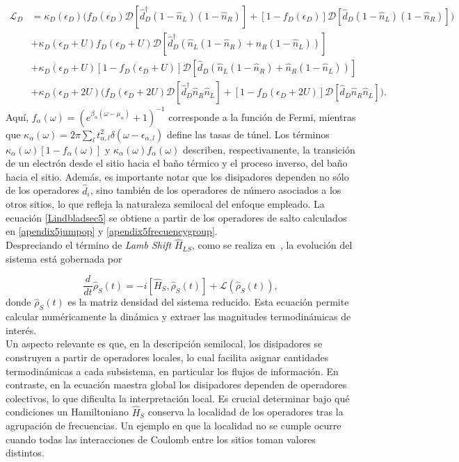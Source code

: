 \begin{align*}
\mathcal{L}_D &= \kappa_D(\epsilon_D)\big( f_D(\epsilon_D)\mathcal{D}[\hat{d}^\dagger_D(1-\hat{n}_L)(1-\hat{n}_R)] + [1-f_D(\epsilon_D)]\mathcal{D}[\hat{d}_D(1-\hat{n}_L)(1-\hat{n}_R)] \big) \\ 
&+ \kappa_D(\epsilon_D+U) f_D(\epsilon_D+U)\mathcal{D}[\hat{d}^\dagger_D(\hat{n}_L(1-\hat{n}_R) + \hat{n}_R(1-\hat{n}_L) )] \\
&+ \kappa_D(\epsilon_D+U) [1-f_D(\epsilon_D+U)]\mathcal{D}[\hat{d}_D(\hat{n}_L(1-\hat{n}_R) + \hat{n}_R(1-\hat{n}_L))]  \\
&+ \kappa_D(\epsilon_D+2U)\big( f_D(\epsilon_D+2U)\mathcal{D}[\hat{d}^\dagger_D\hat{n}_R\hat{n}_L] + [1-f_D(\epsilon_D+2U)]\mathcal{D}[\hat{d}_D\hat{n}_R\hat{n}_L] \big).
\end{align*}
Aquí, $f_\alpha(\omega) = \left(e^{\beta_\alpha(\omega-\mu_\alpha)}+1\right)^{-1}$ corresponde a la función de Fermi, mientras que $\kappa_\alpha(\omega) = 2\pi\sum_l t^2_{\alpha,l}\delta(\omega-\epsilon_{\alpha,l})$ define las tasas de túnel. Los términos $\kappa_\alpha(\omega)[1-f_\alpha(\omega)]$ y $\kappa_\alpha(\omega)f_{\alpha}(\omega)$ describen, respectivamente, la transición de un electrón desde el sitio hacia el baño térmico y el proceso inverso, del baño hacia el sitio. Además, es importante notar que los disipadores dependen no sólo de los operadores $\hat{d}_{i}$, sino también de los operadores de número asociados a los otros sitios, lo que refleja la naturaleza semilocal del enfoque empleado. La ecuación \eqref{Lindbladsec5} se obtiene a partir de los operadores de salto calculados en \ref{apendix5jumpop} y \ref{apendix5frecuencygroup}. 
\\

Despreciando el término de \textit{Lamb Shift} $\hat{H}_{LS}$, como se realiza en~\cite{prech2023entanglement}, la evolución del sistema está gobernada por  

\begin{equation}
    \frac{d}{dt}\hat{\rho}_{S}(t) = -i[\hat{H}_{S},\hat{\rho}_{S}(t)] + \mathcal{L}(\hat{\rho}_{S}(t)),
\end{equation}
donde $\hat{\rho}_{S}(t)$ es la matriz densidad del sistema reducido. Esta ecuación permite calcular numéricamente la dinámica y extraer las magnitudes termodinámicas de interés.  
\\

Un aspecto relevante es que, en la descripción semilocal, los disipadores se construyen a partir de operadores locales, lo cual facilita asignar cantidades termodinámicas a cada subsistema, en particular los flujos de información. En contraste, en la ecuación maestra global los disipadores dependen de operadores colectivos, lo que dificulta la interpretación local. Es crucial determinar bajo qué condiciones un Hamiltoniano $\hat{H}_S$ conserva la localidad de los operadores tras la agrupación de frecuencias. Un ejemplo en que la localidad no se cumple ocurre cuando todas las interacciones de Coulomb entre los sitios toman valores distintos.

